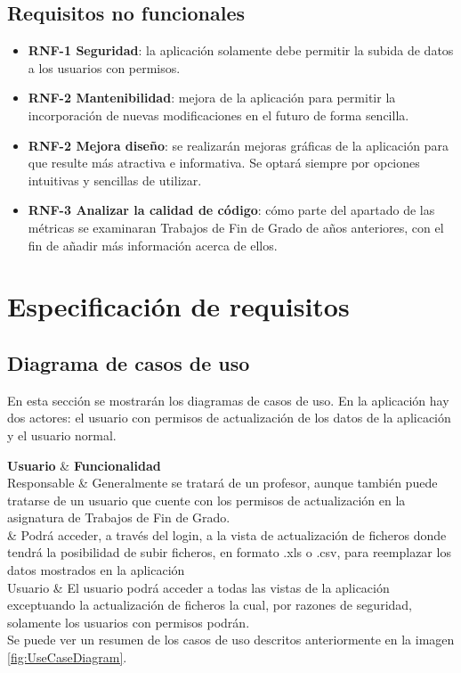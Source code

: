 \subsection{Requisitos no funcionales}
\begin{itemize}
	\item \textbf{RNF-1 Seguridad}: la aplicación solamente debe permitir la subida de datos a los usuarios con permisos.	
	\item \textbf{RNF-2 Mantenibilidad}: mejora de la aplicación para permitir la incorporación de nuevas modificaciones en el futuro de forma sencilla. 	
	\item \textbf{RNF-2 Mejora diseño}: se realizarán mejoras gráficas de la aplicación para que resulte más atractiva e informativa. Se optará siempre por opciones intuitivas y sencillas de utilizar.	
	\item \textbf{RNF-3 Analizar la calidad de código}: cómo parte del apartado de las métricas se examinaran Trabajos de Fin de Grado de años anteriores, con el fin de añadir más información acerca de ellos.

\end{itemize}

\section{Especificación de requisitos}

\subsection{Diagrama de casos de uso}
En esta sección se mostrarán los diagramas de casos de uso. En la aplicación hay dos actores: el usuario con permisos de actualización de los datos de la aplicación y el usuario normal.

{\textbf{Usuario} & \textbf{Funcionalidad} \\}{
	Responsable & Generalmente se tratará de un profesor, aunque también puede tratarse de un usuario que cuente con los permisos de actualización en la asignatura de Trabajos de Fin de Grado. \\\hline
	& Podrá acceder, a través del login, a la vista de actualización de ficheros donde tendrá la posibilidad de subir ficheros, en formato .xls o .csv, para reemplazar los datos mostrados en la aplicación \\
	
	Usuario & El usuario podrá acceder a todas las vistas de la aplicación exceptuando la actualización de ficheros la cual, por razones de seguridad, solamente los usuarios con permisos podrán. \\
}
Se puede ver un resumen de los casos de uso descritos anteriormente en la imagen \ref{fig:UseCaseDiagram}.

